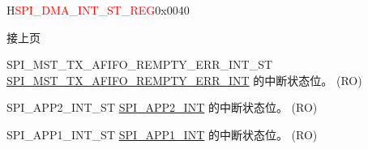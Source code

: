 \addtocounter{Regfloat}{-1}
\begin{register}{H}{\textcolor{red}{SPI\_DMA\_INT\_ST\_REG}}{0x{}0040}
\begin{regdesc}\begin{reglist}
\item [接上页]
\label{fielddesc:SPIMSTTXAFIFOREMPTYERRINTST}\item [SPI\_MST\_TX\_AFIFO\_REMPTY\_ERR\_INT\_ST] \hyperref[int:SPIMSTTXAFIFOREMPTYERRINT]{SPI\_MST\_TX\_AFIFO\_REMPTY\_ERR\_INT} 的中断状态位。 (RO)
\label{fielddesc:SPIAPP2INTST}\item [SPI\_APP2\_INT\_ST] \hyperref[int:SPIAPP2INT]{SPI\_APP2\_INT} 的中断状态位。 (RO)
\label{fielddesc:SPIAPP1INTST}\item [SPI\_APP1\_INT\_ST] \hyperref[int:SPIAPP1INT]{SPI\_APP1\_INT} 的中断状态位。 (RO)
\end{reglist}\end{regdesc}
\end{register}


